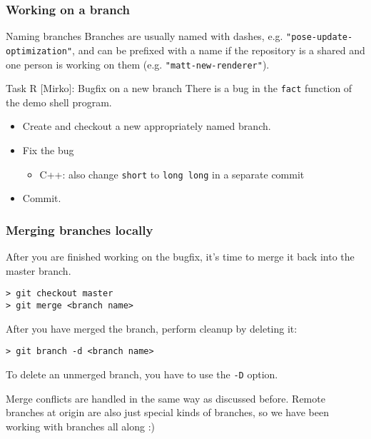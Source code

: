 \begin{frame}[fragile]

\frametitle{Working on a branch}

\begin{block}{Naming branches}
	Branches are usually named with dashes, e.g. \texttt{"pose-update-optimization"}, and can be prefixed with a name if the repository is a shared and one person is working on them (e.g.  \texttt{"matt-new-renderer"}).
\end{block}	

\begin{block}{Task R [Mirko]: Bugfix on a new branch}
There is a bug in the \texttt{fact} function of the demo shell program. 
	\begin{itemize}
	\item Create and checkout a new appropriately named branch.
	\item Fix the bug
	\begin{itemize}
	\item C++: also change \texttt{short} to \texttt{long long} in a separate commit
	\end{itemize}
	\item Commit.
	\end{itemize}
\end{block}	

\end{frame}


\begin{frame}[fragile]

\frametitle{Merging branches locally}

After you are finished working on the bugfix, it's time to merge it back into the master branch.
\begin{verbatim}
> git checkout master
> git merge <branch name>
\end{verbatim}

After you have merged the branch, perform cleanup by deleting it:\begin{verbatim}
> git branch -d <branch name>
\end{verbatim}

To delete an unmerged branch, you have to use the \texttt{-D} option.

\medskip
Merge conflicts are handled in the same way as discussed before. Remote branches at origin are also just special kinds of branches, so we have been working with branches all along :) 

\end{frame}


